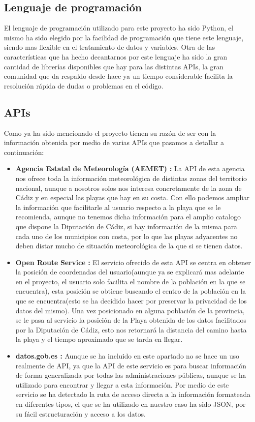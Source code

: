 \documentclass[a4paper,11pt]{article}
\begin{document}
    \subsection{Lenguaje de programación}
    El lenguaje de programación utilizado para este proyecto ha sido Python, el mismo ha sido elegido por la facilidad de programación que tiene este lenguaje, siendo mas flexible en el tratamiento de datos y variables. Otra de las características que ha hecho decantarnos por este lenguaje ha sido la gran cantidad de librerías disponibles que hay para las distintas APIs, la gran comunidad que da respaldo desde hace ya un tiempo considerable facilita la resolución rápida de dudas o problemas en el código.
    \subsection{APIs}
    Como ya ha sido mencionado el proyecto tienen su razón de ser con la información obtenida por medio de varias APIs que pasamos a detallar a continuación:
    \begin{itemize}
        \item \textbf{Agencia Estatal de Meteorología (AEMET) :} La API de esta agencia nos ofrece toda la información meteorológica de distintas zonas del territorio nacional, aunque a nosotros solos nos interesa concretamente de la zona de Cádiz y en especial las playas que hay en su costa. Con ello podemos ampliar la información que facilitarle al usuario respecto a la playa que se le recomienda, aunque no tenemos dicha información para el amplio catalogo que dispone la Diputación de Cádiz, si hay información de la misma para cada uno de los municipios con costa, por lo que las playas adyacentes no deben distar mucho de situación meteorológica de la que si se tienen datos.
        \item \textbf{Open Route Service :} El servicio ofrecido de esta API se centra en obtener la posición de coordenadas del usuario(aunque ya se explicará mas adelante en el proyecto, el usuario solo facilita el nombre de la población en la que se encuentra), esta posición se obtiene buscando el centro de la población en la que se encuentra(esto se ha decidido hacer por preservar la privacidad de los datos del mismo). Una vez posicionado en alguna población de la provincia, se le pasa al servicio la posición de la Playa obtenida de los datos facilitados por la Diputación de Cádiz, esto nos retornará la distancia del camino hasta la playa y el tiempo aproximado que se tarda en llegar.
        \item \textbf{datos.gob.es :} Aunque se ha incluido en este apartado no se hace un uso realmente de API, ya que la API de este servicio es para buscar información de forma generalizada por todas las administraciones públicas, aunque se ha utilizado para encontrar y llegar a esta información. Por medio de este servicio se ha detectado la ruta de acceso directa a la información formateada en diferentes tipos, el que se ha utilizado en nuestro caso ha sido JSON, por su fácil estructuración y acceso a los datos.
    \end{itemize}
\end{document}
